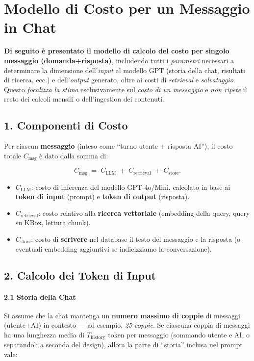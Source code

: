 \documentclass{article}
\begin{document}
\section*{Modello di Costo per un Messaggio in Chat}

\textbf{Di seguito è presentato il modello di calcolo del costo per singolo messaggio (domanda+risposta)}, includendo tutti i \emph{parametri} necessari a determinare la dimensione dell'\emph{input} al modello GPT (storia della chat, risultati di ricerca, ecc.) e dell'\emph{output} generato, oltre ai costi di \emph{retrieval} e \emph{salvataggio}. Questo \emph{focalizza la stima} esclusivamente sul \emph{costo di un messaggio} e \emph{non ripete} il resto dei calcoli mensili o dell'ingestion dei contenuti.

\subsection*{1. Componenti di Costo}

Per ciascun \textbf{messaggio} (inteso come ``turno utente + risposta AI''), il costo totale \(C_{\text{msg}}\) è dato dalla somma di:

\[
C_{\text{msg}} \;=\; C_{\text{LLM}} \;+\; C_{\text{retrieval}} \;+\; C_{\text{store}}.
\]

\begin{itemize}
    \item \(\displaystyle C_{\text{LLM}}\): costo di inferenza del modello GPT-4o/Mini, calcolato in base ai \textbf{token di input} (prompt) e \textbf{token di output} (risposta).
    \item \(\displaystyle C_{\text{retrieval}}\): costo relativo alla \textbf{ricerca vettoriale} (embedding della query, query su KBox, lettura chunk).
    \item \(\displaystyle C_{\text{store}}\): costo di \textbf{scrivere} nel database il testo del messaggio e la risposta (o eventuali embedding aggiuntivi se indicizziamo la conversazione).
\end{itemize}

\subsection*{2. Calcolo dei Token di Input}

\paragraph{2.1 Storia della Chat}
Si assume che la chat mantenga un \textbf{numero massimo di coppie} di messaggi (utente+AI) in contesto --- ad esempio, \emph{25 coppie}. Se ciascuna coppia di messaggi ha una lunghezza media di \(T_{\text{history}}\) token per messaggio (sommando utente e AI, o separandoli a seconda del design), allora la parte di ``storia'' inclusa nel prompt vale:
\end{document}
